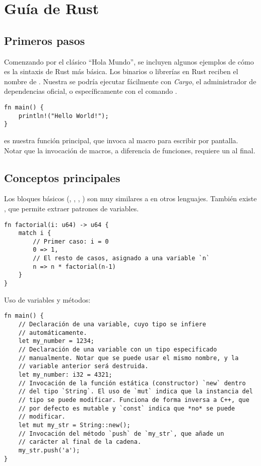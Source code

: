 \chapter{Guía de Rust}\label{annex:rust}

\section{Primeros pasos}

Comenzando por el clásico ``Hola Mundo'', se incluyen algunos ejemplos de cómo
es la sintaxis de Rust más básica. Los binarios o librerías en Rust reciben el
nombre de \crate. Nuestra \crate se podría ejecutar fácilmente con \emph{Cargo},
el administrador de dependencias oficial, o específicamente con el comando
.

\begin{verbatim}
fn main() {
    println!("Hello World!");
}
\end{verbatim}

 es nuestra función principal, que invoca al macro 
para escribir por pantalla. Notar que la invocación de macros, a diferencia de
funciones, requiere un \rust{!} al final.

\section{Conceptos principales}

Los bloques básicos (, , , ) son muy
similares a en otros lenguajes. También existe , que permite extraer
patrones de variables.

\begin{verbatim}
fn factorial(i: u64) -> u64 {
    match i {
        // Primer caso: i = 0
        0 => 1,
        // El resto de casos, asignado a una variable `n`
        n => n * factorial(n-1)
    }
}
\end{verbatim}

Uso de variables y métodos:

\begin{verbatim}
fn main() {
    // Declaración de una variable, cuyo tipo se infiere
    // automáticamente.
    let my_number = 1234;
    // Declaración de una variable con un tipo especificado
    // manualmente. Notar que se puede usar el mismo nombre, y la
    // variable anterior será destruida.
    let my_number: i32 = 4321;
    // Invocación de la función estática (constructor) `new` dentro
    // del tipo `String`. El uso de `mut` indica que la instancia del
    // tipo se puede modificar. Funciona de forma inversa a C++, que
    // por defecto es mutable y `const` indica que *no* se puede
    // modificar.
    let mut my_str = String::new();
    // Invocación del método `push` de `my_str`, que añade un
    // carácter al final de la cadena.
    my_str.push('a');
}
\end{verbatim}

